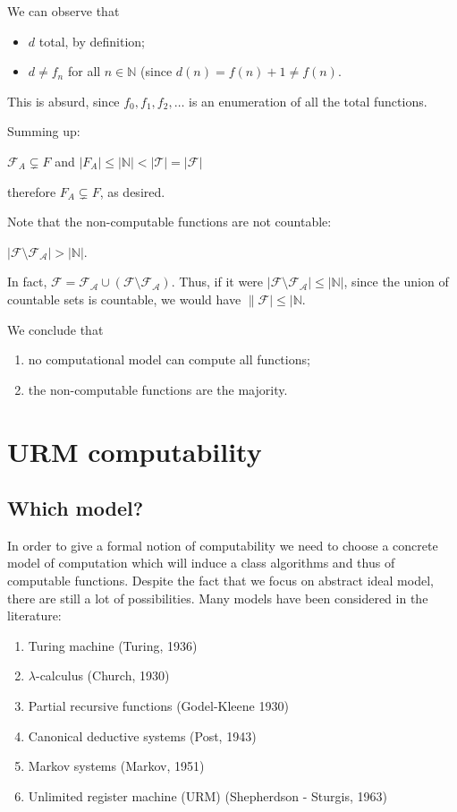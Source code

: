 \documentclass{amsbook}
\newcommand{\nat}{\ensuremath{\mathbb{N}}}
\theoremstyle{definition}
\theoremstyle{remark}
\numberwithin{section}{chapter}
\numberwithin{equation}{chapter}
\begin{document}
We can observe that
\begin{itemize}
\item $d$ total, by definition;
\item $d \neq f_n$ for all $n \in \nat$ (since $d(n) = f(n)+1 \neq f(n)$.
\end{itemize}
This is absurd, since $f_0, f_1, f_2, \ldots$ is an enumeration of all the total functions.

\medskip

Summing up:
\begin{center}
  $\mathcal{F}_A \subsetneq F$ and
  $|F_A| \leq |\nat| < |\mathcal{T}| = |\mathcal{F}|$
\end{center}
therefore $F_A \subsetneq F$, as desired.

Note that the non-computable functions are not countable:
\begin{center}
  $|\mathcal{F} \setminus \mathcal{F}_{\mathcal{A}}| > |\nat|$.
\end{center}
In fact, $\mathcal{F} = \mathcal{F}_{\mathcal{A}} \cup (\mathcal{F} \setminus \mathcal{F}_{\mathcal{A}})$. Thus, if it were $|\mathcal{F} \setminus \mathcal{F}_{\mathcal{A}}| \leq |\nat|$, since the union of countable sets is countable, we would have $\|\mathcal{F}| \leq |\nat$.

We conclude that
\begin{enumerate}
\item no computational model can compute all  functions;
\item the non-computable functions are the majority.
\end{enumerate}

\chapter{URM computability}

\section {Which model?}

In order to give a formal notion of computability we need to choose a concrete model of computation which will induce a class algorithms and thus of computable functions. Despite the fact that we focus on abstract ideal model, there are still a lot of possibilities. Many models have been considered in the literature:

\begin{enumerate}
\item Turing machine (Turing, 1936)
\item $\lambda$-calculus (Church, 1930)
\item Partial recursive functions (Godel-Kleene 1930)
\item Canonical deductive systems (Post, 1943)
\item Markov systems (Markov, 1951)
\item Unlimited register machine (URM) (Shepherdson - Sturgis, 1963)
\end{enumerate}
\end{document}
